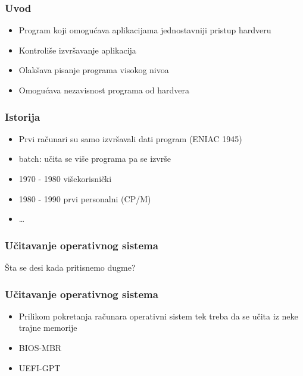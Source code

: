 \documentclass{beamer}
\begin{document}
\begin{frame}
    \frametitle{Uvod}
    \begin{itemize}
        \item Program koji omogućava aplikacijama jednostavniji pristup hardveru \newline
        \item Kontroliše izvršavanje aplikacija \newline
        \item Olakšava pisanje programa visokog nivoa \newline
        \item Omogućava nezavisnost programa od hardvera \newline
    \end{itemize}
\end{frame}

\begin{frame}
    \frametitle{Istorija}
    \begin{itemize}
        \item Prvi računari su samo izvršavali dati program (ENIAC 1945) \newline
        \item batch: učita se više programa pa se izvrše \newline
        \item 1970 - 1980 višekorisnički \newline
        \item 1980 - 1990 prvi personalni (CP/M) \newline
        \item \dots
    \end{itemize}
\end{frame}

\begin{frame}
    \frametitle{Učitavanje operativnog sistema}
    \begin{center}
        \LARGE{Šta se desi kada pritisnemo dugme?}
    \end{center}
\end{frame}

\begin{frame}
    \frametitle{Učitavanje operativnog sistema}
    \begin{itemize}
        \item Prilikom pokretanja računara operativni sistem tek treba da se učita iz neke trajne memorije \newline
        \item BIOS-MBR \newline
        \item UEFI-GPT
    \end{itemize}
\end{frame}
\end{document}
